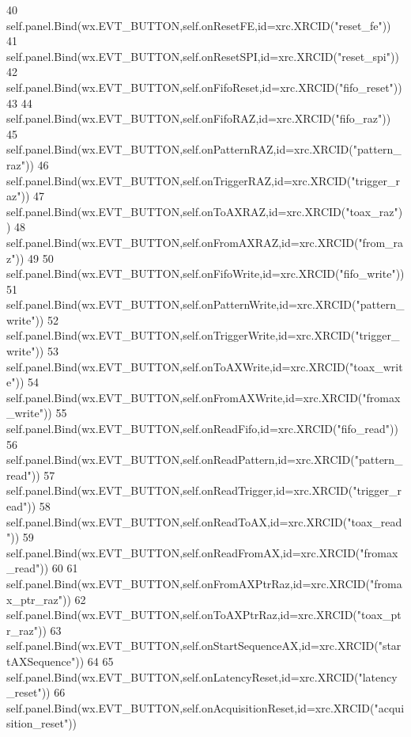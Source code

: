 \begin{DoxyCode}
40         self.panel.Bind(wx.EVT\_BUTTON,self.onResetFE,id=xrc.XRCID(\textcolor{stringliteral}{"reset\_fe"}))
41         self.panel.Bind(wx.EVT\_BUTTON,self.onResetSPI,id=xrc.XRCID(\textcolor{stringliteral}{"reset\_spi"}))
42         self.panel.Bind(wx.EVT\_BUTTON,self.onFifoReset,id=xrc.XRCID(\textcolor{stringliteral}{"fifo\_reset"}))
43 
44         self.panel.Bind(wx.EVT\_BUTTON,self.onFifoRAZ,id=xrc.XRCID(\textcolor{stringliteral}{"fifo\_raz"}))
45         self.panel.Bind(wx.EVT\_BUTTON,self.onPatternRAZ,id=xrc.XRCID(\textcolor{stringliteral}{"pattern\_raz"}))
46         self.panel.Bind(wx.EVT\_BUTTON,self.onTriggerRAZ,id=xrc.XRCID(\textcolor{stringliteral}{"trigger\_raz"}))
47         self.panel.Bind(wx.EVT\_BUTTON,self.onToAXRAZ,id=xrc.XRCID(\textcolor{stringliteral}{"toax\_raz"}))
48         self.panel.Bind(wx.EVT\_BUTTON,self.onFromAXRAZ,id=xrc.XRCID(\textcolor{stringliteral}{"from\_raz"}))
49         
50         self.panel.Bind(wx.EVT\_BUTTON,self.onFifoWrite,id=xrc.XRCID(\textcolor{stringliteral}{"fifo\_write"}))
51         self.panel.Bind(wx.EVT\_BUTTON,self.onPatternWrite,id=xrc.XRCID(\textcolor{stringliteral}{"pattern\_write"}))
52         self.panel.Bind(wx.EVT\_BUTTON,self.onTriggerWrite,id=xrc.XRCID(\textcolor{stringliteral}{"trigger\_write"}))
53         self.panel.Bind(wx.EVT\_BUTTON,self.onToAXWrite,id=xrc.XRCID(\textcolor{stringliteral}{"toax\_write"}))
54         self.panel.Bind(wx.EVT\_BUTTON,self.onFromAXWrite,id=xrc.XRCID(\textcolor{stringliteral}{"fromax\_write"}))
55         self.panel.Bind(wx.EVT\_BUTTON,self.onReadFifo,id=xrc.XRCID(\textcolor{stringliteral}{"fifo\_read"}))
56         self.panel.Bind(wx.EVT\_BUTTON,self.onReadPattern,id=xrc.XRCID(\textcolor{stringliteral}{"pattern\_read"}))
57         self.panel.Bind(wx.EVT\_BUTTON,self.onReadTrigger,id=xrc.XRCID(\textcolor{stringliteral}{"trigger\_read"}))
58         self.panel.Bind(wx.EVT\_BUTTON,self.onReadToAX,id=xrc.XRCID(\textcolor{stringliteral}{"toax\_read"}))
59         self.panel.Bind(wx.EVT\_BUTTON,self.onReadFromAX,id=xrc.XRCID(\textcolor{stringliteral}{"fromax\_read"}))
60 
61         self.panel.Bind(wx.EVT\_BUTTON,self.onFromAXPtrRaz,id=xrc.XRCID(\textcolor{stringliteral}{"fromax\_ptr\_raz"}))
62         self.panel.Bind(wx.EVT\_BUTTON,self.onToAXPtrRaz,id=xrc.XRCID(\textcolor{stringliteral}{"toax\_ptr\_raz"}))
63         self.panel.Bind(wx.EVT\_BUTTON,self.onStartSequenceAX,id=xrc.XRCID(\textcolor{stringliteral}{"startAXSequence"}))
64 
65         self.panel.Bind(wx.EVT\_BUTTON,self.onLatencyReset,id=xrc.XRCID(\textcolor{stringliteral}{"latency\_reset"}))
66         self.panel.Bind(wx.EVT\_BUTTON,self.onAcquisitionReset,id=xrc.XRCID(\textcolor{stringliteral}{"acquisition\_reset"}))

\end{DoxyCode}

